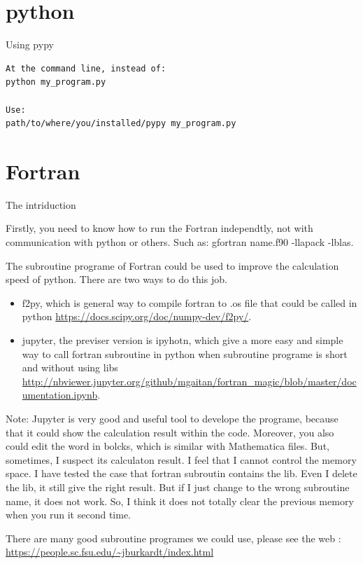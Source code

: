 \section{python}

Using pypy 
\begin{verbatim}
At the command line, instead of:
python my_program.py

Use:
path/to/where/you/installed/pypy my_program.py
\end{verbatim}

\section{Fortran}

The intriduction

Firstly, you need to know how to run the Fortran independtly, not with communication with python or others. Such as: gfortran name.f90 -llapack -lblas.

The subroutine programe of Fortran could be used to improve the calculation speed of python. There are two ways to do this job.

\begin{itemize}
	\item f2py, which is general way to compile fortran to .os file that could be called in python \url{https://docs.scipy.org/doc/numpy-dev/f2py/}.
	\item jupyter, the previser version is ipyhotn, which give a more easy and simple way to call fortran subroutine in python when subroutine programe is short and without using libs \url{http://nbviewer.jupyter.org/github/mgaitan/fortran_magic/blob/master/documentation.ipynb}.
\end{itemize}

Note: Jupyter is very good and useful tool to develope the programe, because that it could show the calculation result within the code. Moreover, you also could edit the word in bolcks, which is similar with Mathematica files. But, sometimes, I suspect its calculaton result. I feel that I cannot control the memory space. I have tested the case that fortran subroutin contains the lib. Even I delete the lib, it still give the right result. But if I just change to the wrong subroutine name, it does not work. So, I think it does not totally clear the previous memory when you run it second time.  


There are many good subroutine programes we could use, please see the web : \url{https://people.sc.fsu.edu/~jburkardt/index.html}



